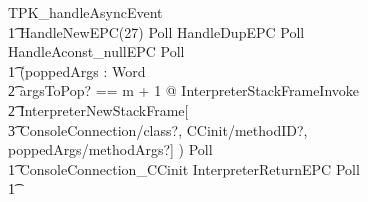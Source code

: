 \begin{figure}[tp!]
  \centering
  \setlength{\zedtab}{0.4cm}
  \setlength{\zedindent}{0pt}
  \setlength{\zedleftsep}{0pt}
  \setlength{\abovedisplayskip}{0pt}
  \setlength{\belowdisplayskip}{0pt}
  \setlength{\abovedisplayshortskip}{0pt}
  \setlength{\belowdisplayshortskip}{0pt}
  \begin{circusaction}
    TPK\_handleAsyncEvent \circdef \\
    \t1 HandleNewEPC(27) \circseq Poll \circseq HandleDupEPC \circseq Poll \circseq  HandleAconst\_nullEPC \circseq Poll \circseq \\
    \t1 (\circvar poppedArgs : \seq Word \circspot \\
    \t2 \lschexpract \exists argsToPop? == m + 1 @ InterpreterStackFrameInvoke \rschexpract \circseq \\
    \t2 \lschexpract InterpreterNewStackFrame[\\
    \t3 ConsoleConnection/class?, CCinit/methodID?, poppedArgs/methodArgs?] \rschexpract) \circseq Poll \circseq \\
    \t1 ConsoleConnection\_CCinit \circseq \lschexpract InterpreterReturnEPC \rschexpract \circseq Poll \circseq \\
    \t1 {} \cdots {} \\

\end{circusaction}
\end{figure}
